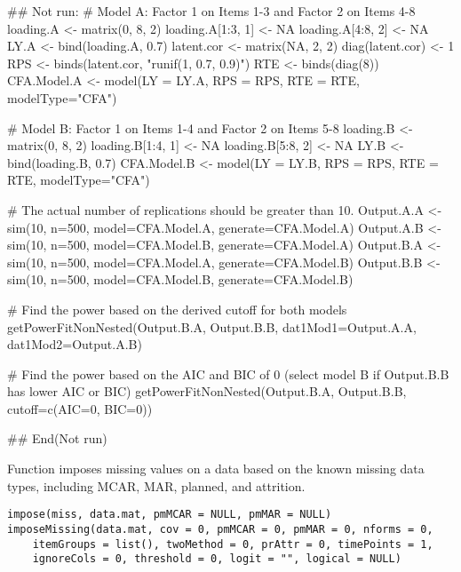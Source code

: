 \documentclass[a4paper]{book}
\begin{document}
%
\begin{Examples}
\begin{ExampleCode}
## Not run: 
# Model A: Factor 1 on Items 1-3 and Factor 2 on Items 4-8
loading.A <- matrix(0, 8, 2)
loading.A[1:3, 1] <- NA
loading.A[4:8, 2] <- NA
LY.A <- bind(loading.A, 0.7)
latent.cor <- matrix(NA, 2, 2)
diag(latent.cor) <- 1
RPS <- binds(latent.cor, "runif(1, 0.7, 0.9)")
RTE <- binds(diag(8))
CFA.Model.A <- model(LY = LY.A, RPS = RPS, RTE = RTE, modelType="CFA")

# Model B: Factor 1 on Items 1-4 and Factor 2 on Items 5-8
loading.B <- matrix(0, 8, 2)
loading.B[1:4, 1] <- NA
loading.B[5:8, 2] <- NA
LY.B <- bind(loading.B, 0.7)
CFA.Model.B <- model(LY = LY.B, RPS = RPS, RTE = RTE, modelType="CFA")

# The actual number of replications should be greater than 10.
Output.A.A <- sim(10, n=500, model=CFA.Model.A, generate=CFA.Model.A) 
Output.A.B <- sim(10, n=500, model=CFA.Model.B, generate=CFA.Model.A) 
Output.B.A <- sim(10, n=500, model=CFA.Model.A, generate=CFA.Model.B) 
Output.B.B <- sim(10, n=500, model=CFA.Model.B, generate=CFA.Model.B) 

# Find the power based on the derived cutoff for both models
getPowerFitNonNested(Output.B.A, Output.B.B, dat1Mod1=Output.A.A, dat1Mod2=Output.A.B)

# Find the power based on the AIC and BIC of 0 (select model B if Output.B.B has lower AIC or BIC)
getPowerFitNonNested(Output.B.A, Output.B.B, cutoff=c(AIC=0, BIC=0))

## End(Not run)
\end{ExampleCode}
\end{Examples}
%
\begin{Description}\relax
Function imposes missing values on a data based on the known missing data types,
including MCAR, MAR, planned, and attrition.
\end{Description}
%
\begin{Usage}
\begin{verbatim}
impose(miss, data.mat, pmMCAR = NULL, pmMAR = NULL)
imposeMissing(data.mat, cov = 0, pmMCAR = 0, pmMAR = 0, nforms = 0, 
	itemGroups = list(), twoMethod = 0, prAttr = 0, timePoints = 1, 
	ignoreCols = 0, threshold = 0, logit = "", logical = NULL)
\end{verbatim}
\end{Usage}
\end{document}
